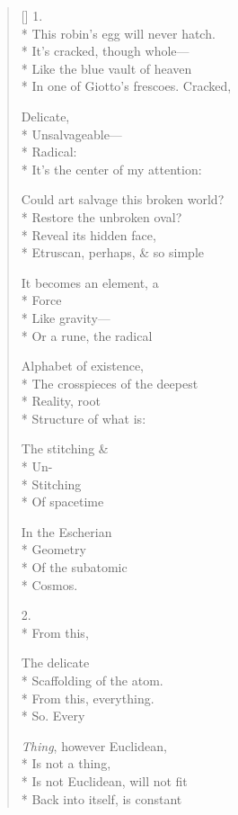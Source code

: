 \label{ch:the_second_law}
\settowidth{\versewidth}{In one of Giotto's frescoes.  Cracked,}
\begin{verse}[\versewidth]
1.\\*
This robin's egg will never hatch.\\*
It's cracked, though whole--- \\*
Like the blue vault of heaven\\*
In one of Giotto's frescoes.  Cracked,

Delicate,\\*
Unsalvageable---\\*
Radical:\\*
It's the center of my attention:

Could art salvage this broken world?\\*
Restore the unbroken oval?\\*
Reveal its hidden face,\\*
Etruscan, perhaps, \& so simple

It becomes an element, a\\*
Force\\*
Like gravity--- \\*
Or a rune, the radical

Alphabet of existence,\\*
The crosspieces of the deepest\\*
Reality, root\\*
Structure of what is:

The stitching \&\\*
Un-\\*
Stitching\\*
Of spacetime

In the Escherian \\*
Geometry\\*
Of the subatomic\\*
Cosmos.

2.\\*
 From this,

The delicate\\*
Scaffolding of the atom.\\*
From this, everything.\\*
So. \qquad Every

\textit{Thing}, however Euclidean,\\*
Is not a thing,\\*
Is not Euclidean, will not fit\\*
Back into itself, is constant


\end{verse}
